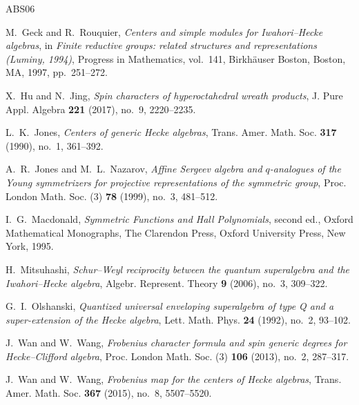 \documentclass[11pt]{amsart}
\numberwithin{equation}{section}
\theoremstyle{plain}
\theoremstyle{definition}
\theoremstyle{remark}
\begin{document}
\begin{thebibliography}{ABS06}


M.~Geck and R.~Rouquier,
\emph{Centers and simple modules for Iwahori--Hecke algebras},
in \emph{Finite reductive groups: related structures and
representations (Luminy, 1994)},
Progress in Mathematics, vol.~141,
Birkh\"auser Boston, Boston, MA, 1997, pp.~251--272.

X.~Hu and N.~Jing,
\emph{Spin characters of hyperoctahedral wreath products},
J. Pure Appl. Algebra \textbf{221} (2017), no.~9, 2220--2235.

L.~K.~Jones,
\emph{Centers of generic Hecke algebras},
Trans. Amer. Math. Soc. \textbf{317} (1990), no.~1, 361--392.

A.~R.~Jones and M.~L.~Nazarov,
\emph{Affine Sergeev algebra and $q$-analogues of the Young
symmetrizers for projective representations of the symmetric group},
Proc. London Math. Soc. (3) \textbf{78} (1999), no.~3, 481--512.

I.~G.~Macdonald,
\emph{Symmetric Functions and Hall Polynomials},
second ed., Oxford Mathematical Monographs,
The Clarendon Press, Oxford University Press, New York, 1995.

H.~Mitsuhashi,
\emph{Schur--Weyl reciprocity between the quantum superalgebra and the Iwahori--Hecke algebra}, Algebr. Represent. Theory \textbf{9} (2006), no.~3, 309--322.

G.~I.~Olshanski,
\emph{Quantized universal enveloping superalgebra of type Q and a super-extension of the Hecke algebra}, Lett. Math. Phys. \textbf{24} (1992), no.~2, 93--102.


J.~Wan and W.~Wang,
\emph{Frobenius character formula and spin generic degrees for
Hecke--Clifford algebra},
Proc. London Math. Soc. (3) \textbf{106} (2013), no.~2, 287--317.

J.~Wan and W.~Wang,
\emph{Frobenius map for the centers of Hecke algebras},
Trans. Amer. Math. Soc. \textbf{367} (2015), no.~8, 5507--5520.

\end{thebibliography}
\end{document}
